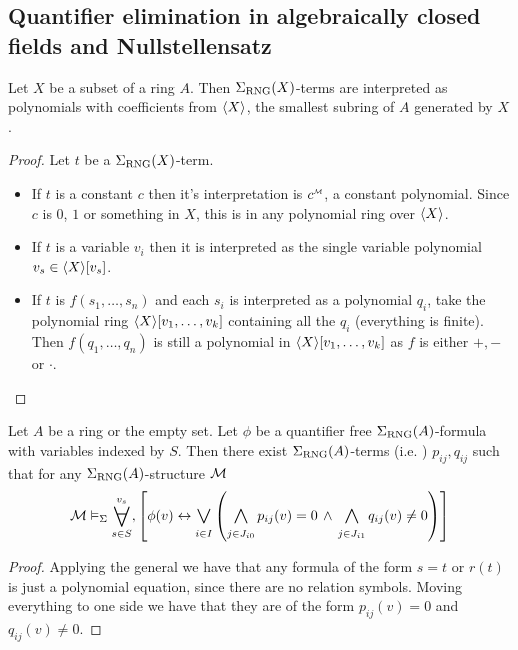 \subsection{Quantifier elimination in algebraically closed fields
and Nullstellensatz}

\begin{lem}
    Let $X$ be a subset of a ring $A$.
    Then $\Sigma_{\mathrm{RNG}}(X)$-terms are interpreted as 
    polynomials with coefficients from $\langle X\rangle$,
    the smallest subring of $A$ generated by $X$.
\end{lem}
\begin{proof}
    Let $t$ be a $\Sigma_{\mathrm{RNG}}(X)$-term.
    \begin{itemize}
        \item If $t$ is a constant $c$ then it's interpretation is
            $\modintp{\MM}{c}$, a constant polynomial. 
            Since $c$ is $0$, $1$ or something in $X$,
            this is in any polynomial ring over $\langle X\rangle$.
        \item If $t$ is a variable $v_i$ then it is interpreted as
            the single variable polynomial $v_s \in \langle X\rangle[v_s]$.
        \item If $t$ is $f(s_1,\dots,s_n)$ and each $s_i$ 
            is interpreted as a polynomial $q_i$,
            take the polynomial ring $\langle X\rangle[v_1,\dots,v_k]$
            containing all the $q_i$ (everything is finite).
            Then $f(q_1,\dots,q_n)$ 
            is still a polynomial in $\langle X\rangle[v_1,\dots,v_k]$
            as $f$ is either $+,-$ or $\cdot$.
    \end{itemize} 
\end{proof}

\begin{lem}
    Let $A$ be a ring or the empty set.
    Let $\phi$ be a quantifier free $\Sigma_{\mathrm{RNG}}(A)$-formula with variables indexed
    by $S$.
    Then there exist $\Sigma_{\mathrm{RNG}}(A)$-terms 
    (i.e. )
    $p_{ij}, q_{ij}$ such that
    for any $\Sigma_{\mathrm{RNG}}(A)$-structure $\mathcal{M}$
    \[ 
        \MM \model{\Si} \bigforall{s \in S}{v_s}, \sqbrkt{\phi(v) 
        \IFF \bigor{i \in I}{} 
        \brkt{\bigand{j \in J_{i0}}{} p_{ij}(v) = 0 \AND 
        \bigand{j \in J_{i1}}{} q_{ij}(v) \ne 0}}
    \]
\end{lem}
\begin{proof}
    Applying the general 
     we have that
    any formula of the form $s = t$ or $r(t)$ is just a polynomial equation, 
    since there are no relation symbols.
    Moving everything to one side we have that they are of the form 
    $p_{ij}(v) = 0$ and $q_{ij}(v) \ne 0$.
\end{proof}

